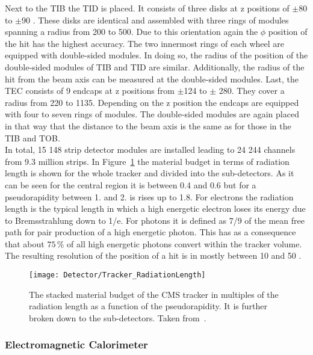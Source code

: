 Next to the TIB the TID is placed. It consists of three disks at z positions of $\pm{}$80 to $\pm$90\cm{} . These disks are identical and assembled with three rings of modules spanning a radius from 200 to 500\mm{}. Due to this orientation again the $\phi{}$ position of the hit has the highest accuracy. The two innermost rings of each wheel are equipped with double-sided modules. In doing so, the radius of the position of the double-sided modules of TIB and TID are similar. Additionally, the radius of the hit from the beam axis can be measured at the double-sided modules. Last, the TEC consists of 9 endcaps at z positions from $\pm{}$124 to $\pm{}$ 280\cm{}. They cover a radius from 220 to 1135\mm{}. Depending on the z position the endcaps are equipped with four to seven rings of modules. The double-sided modules are again placed in that way that the distance to the beam axis is the same as for those in the TIB and TOB. \\
In total, 15 148 strip detector modules are installed leading to 24 244 channels from 9.3 million strips. In Figure~\ref{plot:LHCCMSTrackerRadiationLength} the material budget in terms of radiation length is shown for the whole tracker and divided into the sub-detectors. As it can be seen for the central region it is between 0.4 and 0.6 but for a pseudorapidity between 1. and 2. is rises up to 1.8. For electrons the radiation length is the typical length in which a high energetic electron loses its energy due to Bremsstrahlung down to 1/e. For photons it is defined as 7/9 of the mean free path for pair production of a high energetic photon. This has as a consequence that about $75\,\%$ of all high energetic photons convert within the tracker volume.\\
The resulting resolution of the position of a hit is in mostly between 10 and 50\mum{} \cite{CMS-PAPER-TRK-11-001}.

\begin{figure}[!Hhtb]
    \centering
    \texttt{[image: Detector/Tracker\_RadiationLength]}
    \caption[Material budget of the CMS Tracker]{The stacked material budget of the CMS tracker in multiples of the radiation length as a function of the pseudorapidity. It is further broken down to the sub-detectors. Taken from~. \label{plot:LHCCMSTrackerRadiationLength}}
\end{figure}

\subsubsection{Electromagnetic Calorimeter}

